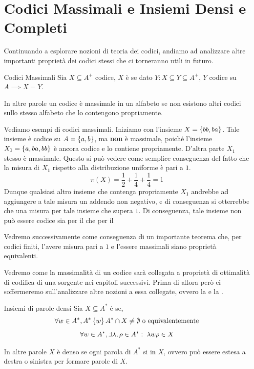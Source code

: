 \section{Codici Massimali e Insiemi Densi e Completi}

Continuando a esplorare nozioni di teoria dei codici, andiamo ad analizzare altre importanti proprietà dei codici stessi che ci torneranno utili in futuro.

\begin{definition}{Codici Massimali}
  Sia \(X \subseteq A^+\) codice, \(X\) è  se dato \(Y: X\subseteq Y \subseteq A^+\), \(Y\) codice su \(A \implies X = Y\).

  In altre parole un codice è massimale in un alfabeto se non esistono altri codici sullo stesso alfabeto che lo contengono propriamente.
\end{definition}

\begin{example}{}
  Vediamo esempi di codici massimali.
  Iniziamo con l'insieme \(X = \set{bb,ba}\). Tale insieme è codice su \(A = \set{a,b}\), ma \textbf{non} è massimale, poiché l'insieme \(X_1 = \set{a,ba,bb}\) è ancora codice e lo contiene propriamente.
  D'altra parte \(X_1\) stesso è massimale. Questo si può vedere come semplice conseguenza del fatto che la misura di \(X_1\) rispetto alla distribuzione uniforme è pari a \(1\).
  \[\pi(X) = \frac{1}{2} + \frac{1}{4} + \frac{1}{4} = 1\]
  Dunque qualsiasi altro insieme che contenga propriamente \(X_1\) andrebbe ad aggiungere a tale misura un addendo non negativo, e di conseguenza si otterrebbe che una misura per tale insieme che supera \(1\).
  Di conseguenza, tale insieme non può essere codice sia per il  che per il 

  Vedremo successivamente come conseguenza di un importante teorema che, per codici finiti, l'avere misura pari a \(1\) e l'essere massimali siano proprietà equivalenti.
\end{example}

Vedremo come la massimalità di un codice sarà collegata a proprietà di ottimalità di codifica di una sorgente nei capitoli successivi.
Prima di allora però ci soffermeremo sull'analizzare altre nozioni a essa collegate, ovvero la  e la .

\begin{definition}{Insiemi di parole densi}
  Sia \(X \subseteq A^*\) è  se, 
  \[\forall w \in A^*,A^*\set{w}A^* \cap X \neq \emptyset \text{ o equivalentemente}\]
  \[\forall w \in A^*, \exists \lambda,\rho\in A^* :\; \lambda w \rho \in X\]

  In altre parole \(X\) è denso se ogni parola di \(A^*\) si  in \(X\), ovvero può essere estesa a destra o sinistra per formare parole di \(X\).
\end{definition}

